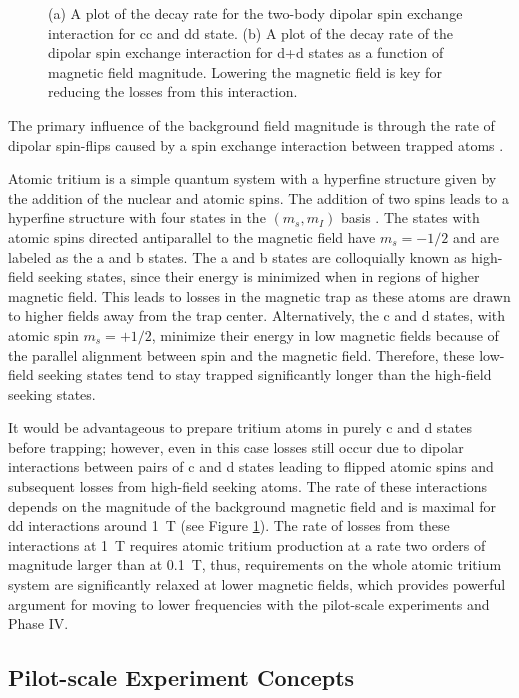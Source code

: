 \begin{figure}[htbp]
\begin{subfigure}{0.49\textwidth}
        \caption{}
    \end{subfigure}
    \caption{(a) A plot of the decay rate for the two-body dipolar spin exchange interaction for cc and dd state. (b) A plot of the decay rate of the dipolar spin exchange interaction for d+d states as a function of magnetic field magnitude. Lowering the magnetic field is key for reducing the losses from this interaction.}
    \label{fig:chap3-dipolarloss}
 \end{figure}
 The primary influence of the background field magnitude is through the rate of dipolar spin-flips caused by a spin exchange interaction between trapped atoms \cite{tritium_spin_exchange}. 
 
 Atomic tritium is a simple quantum system with a hyperfine structure given by the addition of the nuclear and atomic spins. The addition of two spins leads to a hyperfine structure with four states in the $(m_s,m_I)$ basis \cite{tritium_hyperfine}. The states with atomic spins directed antiparallel to the magnetic field have $m_s=-1/2$ and are labeled as the a and b states. The a and b states are colloquially known as high-field seeking states, since their energy is minimized when in regions of higher magnetic field. This leads to losses in the magnetic trap as these atoms are drawn to higher fields away from the trap center. Alternatively, the c and d states, with atomic spin $m_s=+1/2$, minimize their energy in low magnetic fields because of the parallel alignment between spin and the magnetic field. Therefore, these low-field seeking states tend to stay trapped significantly longer than the high-field seeking states.

It would be advantageous to prepare tritium atoms in purely c and d states before trapping; however, even in this case losses still occur due to dipolar interactions between pairs of c and d states leading to flipped atomic spins and subsequent losses from high-field seeking atoms. The rate of these interactions depends on the magnitude of the background magnetic field and is maximal for dd interactions around 1~T (see Figure \ref{fig:chap3-dipolarloss}). The rate of losses from these interactions at 1~T requires atomic tritium production at a rate two orders of magnitude larger than at 0.1~T, thus, requirements on the whole atomic tritium system are significantly relaxed at lower magnetic fields, which provides powerful argument for moving to lower frequencies with the pilot-scale experiments and Phase IV.

\subsection{Pilot-scale Experiment Concepts}


